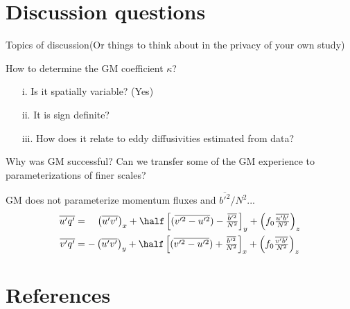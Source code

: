 \documentclass{beamer}
\begin{document}
\section{Discussion questions}
\begin{frame}{Topics of discussion}{(Or things to think about in the privacy of your own study)}
\vspace{-.1cm}
\begin{block}{How to determine the GM coefficient $\kappa$?}
\begin{enumerate}
  \item[i.] Is it spatially variable? (Yes)
  \item[ii.] It is sign definite?
  \item[iii.] How does it relate to eddy diffusivities estimated from data?
\end{enumerate}
\end{block}

\begin{exampleblock}{Why was GM successful?}
 Can we transfer some of the GM experience to parameterizations of finer scales?
\end{exampleblock}

\begin{block}{GM does not parameterize momentum fluxes and $\overline{b'^2}/{N^2}$...}
\vspace{-.2cm}
\begin{align}
\overline{u'q'} &= ~~~ \left(\overline{u'v'}\right)_x + \half \left[(\overline{v'^2 - u'^2})-\tfrac{\overline{b'^2}}{N^2}\right]_y
+ \left(f_0 \tfrac{\overline{u'b'}}{N^2}\right)_z\nonumber\\
\overline{v'q'} &= - \left(\overline{u'v'}\right)_y + \half \left[(\overline{v'^2 - u'^2})+\tfrac{\overline{b'^2}}{N^2}\right]_x +
 \left(f_0 \tfrac{\overline{v'b'}}{N^2}\right)_z\nonumber
\end{align}
\end{block}
\end{frame}

\section{References}
\end{document}
